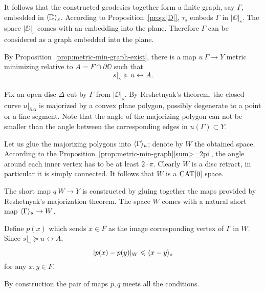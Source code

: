 
It follows that the constructed geodesics together form a finite graph, say $\Gamma$,
embedded in $\langle\mathbb{D}\rangle_s$.
According to Proposition~\ref{prop:|D|},
 $\tau_s$ embeds $\Gamma$ in $|\DD|_s$.
The space $|\DD|_s$ comes with an embedding into the plane.
Therefore $\Gamma$ can be considered as a graph embedded into the plane.

By Proposition~\ref{prop:metric-min-graph-exist}, there is a map $u\:\Gamma\to Y$ metric minimizing relative to $A=F\cap\partial\DD$ such that
\[s|_\gamma\succcurlyeq u\rel A.\]

Fix an open disc $\Delta$ cut by $\Gamma$ from $|\DD|_s$.
By Reshetnyak's theorem, the closed curve $u|_{\partial\Delta}$
is majorized by a convex plane polygon, possibly degenerate to a point or a line segment.
Note that the angle of the majorizing polygon can not be smaller than the angle between the corresponding edges in $u(\Gamma)\subset Y$.

Let us glue the majorizing polygons into $\langle\Gamma\rangle_u$;
denote by $W$ the obtained space.
According to the Proposition~\ref{prop:metric-min-graph}\ref{sum>=2pi}, the angle around each inner vertex has to be at least $2\cdot\pi$.
Clearly $W$ is a disc retract, in particular it is simply connected.
It follows that $W$ is a $\mathop{\rm CAT}\nolimits[0]$ space.

The short map $q\:W\to Y$ is constructed by gluing together the maps provided by Reshetnyak's majorization theorem.
The space $W$ comes with a natural short map $\langle\Gamma\rangle_u\to W$.

Define $p(x)$ which sends $x\in F$ as the image corresponding vertex of $\Gamma$ in $W$.
Since $s|_\gamma\succcurlyeq u\rel A$, 
\[|p(x)-p(y)|_W\leqslant \langle x-y\rangle_s\]
for any $x,y\in F$.

By construction the pair of maps $p,q$ meets all the conditions.
\qeds